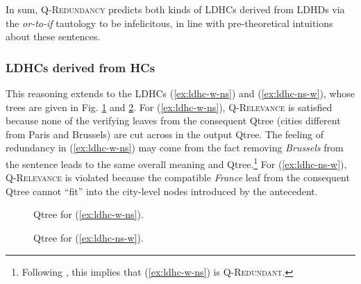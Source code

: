 In sum, \textsc{Q-Redundancy} predicts both kinds of LDHCs derived from LDHDs via the \textit{or-to-if} tautology to be infelicitous, in line with pre-theoretical intuitions about these sentences.




\subsubsection{LDHCs derived from HCs}

This reasoning extends to the LDHCs (\ref{ex:ldhc-w-ns}) and (\ref{ex:ldhc-ns-w}), whose trees are given in Fig. \ref{fig:ldhc-non-scalar-w-ns} and \ref{fig:ldhc-non-scalar-ns-w}. For (\ref{ex:ldhc-w-ns}), \textsc{Q-Relevance} is satisfied because none of the verifying leaves from the consequent Qtree (cities different from Paris and Brussels) are cut across in the output Qtree. The feeling of redundancy in (\ref{ex:ldhc-w-ns}) may come from the fact removing \textit{Brussels} from the sentence leads to the same overall meaning and Qtree.\footnote{Following \citet{HenotMortier2024a,HenotMortier2024b}, this implies that (\ref{ex:ldhc-w-ns}) is \textsc{Q-Redundant}.} For (\ref{ex:ldhc-ns-w}), \textsc{Q-Relevance} is violated because the compatible \textit{France} leaf from the consequent Qtree cannot ``fit'' into the city-level nodes introduced by the antecedent.


\begin{minipage}{.45\linewidth}
	\centering
	\begin{figure}[H]
		\centering
		\caption{Qtree for (\ref{ex:ldhc-w-ns}).}\label{fig:ldhc-non-scalar-w-ns}
	\end{figure}
\end{minipage}
\hfill
\begin{minipage}{.45\linewidth}
	\centering
	\begin{figure}[H]
		\centering
		\caption{Qtree for (\ref{ex:ldhc-ns-w}).}\label{fig:ldhc-non-scalar-ns-w}
	\end{figure}
\end{minipage}





